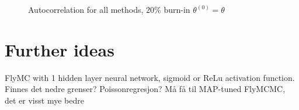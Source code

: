 \begin{figure}%
    \centering
    \qquad
    \caption{Autocorrelation for all methods, $20\%$ burn-in $\theta^{\left(0\right)} = \theta$}%
    \label{fig:autocorrelation_50k_02_06_theta3}%
\end{figure}

\section*{Further ideas}
FlyMC with 1 hidden layer neural network, sigmoid or ReLu activation function. Finnes det nedre grenser? 
Poissonregresjon?
Må få til MAP-tuned FlyMCMC, det er visst mye bedre